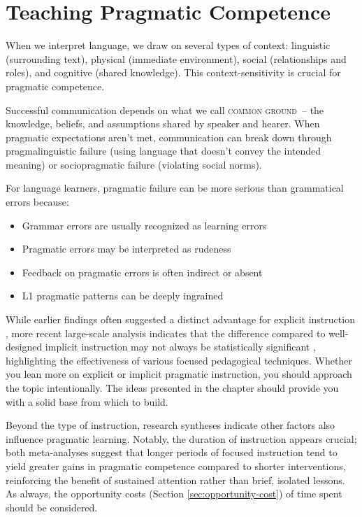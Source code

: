 \section{Teaching Pragmatic Competence}

When we interpret language, we draw on several types of context: linguistic (surrounding text), physical (immediate environment), social (relationships and roles), and cognitive (shared knowledge). This context-sensitivity is crucial for pragmatic competence.

Successful communication depends on what we call \textsc{common ground}~-- the knowledge, beliefs, and assumptions shared by speaker and hearer. When pragmatic expectations aren't met, communication can break down through pragmalinguistic failure (using language that doesn't convey the intended meaning) or sociopragmatic failure (violating social norms).

For language learners, pragmatic failure can be more serious than grammatical errors because:
\begin{itemize}[noitemsep]
    \item Grammar errors are usually recognized as learning errors
    \item Pragmatic errors may be interpreted as rudeness
    \item Feedback on pragmatic errors is often indirect or absent
    \item L1 pragmatic patterns can be deeply ingrained
\end{itemize}


While earlier findings often suggested a distinct advantage for explicit instruction \autocite{JeonKaya2006}, more recent large-scale analysis indicates that the difference compared to well-designed implicit instruction may not always be statistically significant \autocite{RenLiLu2022}, highlighting the effectiveness of various focused pedagogical techniques. Whether you lean more on explicit or implicit pragmatic instruction, you should approach the topic intentionally. The ideas presented in the chapter should provide you with a solid base from which to build.

Beyond the type of instruction, research syntheses indicate other factors also influence pragmatic learning. Notably, the duration of instruction appears crucial; both meta-analyses suggest that longer periods of focused instruction tend to yield greater gains in pragmatic competence compared to shorter interventions, reinforcing the benefit of sustained attention rather than brief, isolated lessons. As always, the opportunity costs (Section \ref{sec:opportunity-cost}) of time spent should be considered.


